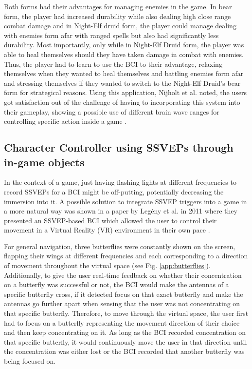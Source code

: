 Both forms had their advantages for managing enemies in the game. In bear form, the player had increased durability while also dealing high close range combat damage and in Night-Elf druid form, the player could manage dealing with enemies form afar with ranged spells but also had significantly less durability. Most importantly, only while in Night-Elf Druid form, the player was able to heal themselves should they have taken damage in combat with enemies. Thus, the player had to learn to use the BCI to their advantage, relaxing themselves when they wanted to heal themselves and battling enemies form afar and stressing themselves if they wanted to switch to the Night-Elf Druid's bear form for strategical reasons. Using this application, Nijholt et al. noted, the users got satisfaction out of the challenge of having to incorporating this system into their gameplay, showing a possible use of different brain wave ranges for controlling specific action inside a game \cite{nijholt-2009}.

\subsection{Character Controller using SSVEPs through in-game objects}
\label{sec:app:butterfly}

In the context of a game, just having flashing lights at different frequencies to record SSVEPs for a BCI might be off-putting, potentially decreasing the immersion into it. A possible solution to integrate SSVEP triggers into a game in a more natural way was shown in a paper by Legény et al. in 2011 where they presented an SSVEP-based BCI which allowed the user to control their movement in a Virtual Reality (VR) environment in their own pace \cite{legeny-2011}.

For general navigation, three butterflies were constantly shown on the screen, flapping their wings at different frequencies and each corresponding to a direction of movement throughout the virtual space (see Fig. \ref{app:butterflies}). Additionally, to give the user real-time feedback on whether their concentration on a butterfly was successful or not, the BCI would make the antennas of a specific butterfly cross, if it detected focus on that exact butterfly and make the antennas go further apart when sensing that the user was not concentrating on that specific butterfly.
Therefore, to move through the virtual space, the user first had to focus on a butterfly representing the movement direction of their choice and then keep concentrating on it. As long as the BCI recorded concentration on that specific butterfly, it would continuously move the user in that direction until the concentration was either lost or the BCI recorded that another butterfly was being focused on.

